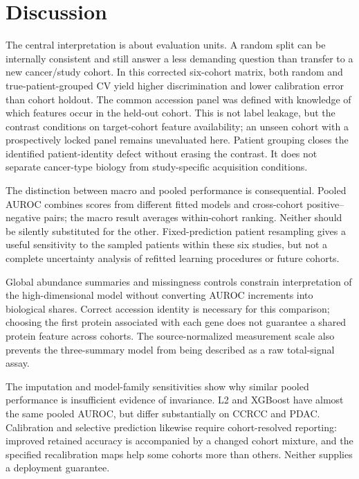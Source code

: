 \section{Discussion}

The central interpretation is about evaluation units. A random split
can be internally consistent and still answer a less demanding question
than transfer to a new cancer/study cohort. In this corrected six-cohort
matrix, both random and true-patient-grouped CV yield higher
discrimination and lower calibration error than cohort holdout.
The common accession panel was defined with knowledge of which features
occur in the held-out cohort. This is not label leakage, but the
contrast conditions on target-cohort feature availability; an unseen
cohort with a prospectively locked panel remains unevaluated here.
Patient grouping closes the identified patient-identity defect without
erasing the contrast. It does not separate cancer-type biology from
study-specific acquisition conditions.

The distinction between macro and pooled performance is consequential.
Pooled AUROC combines scores from different fitted models and
cross-cohort positive--negative pairs; the macro result averages
within-cohort ranking. Neither should be silently substituted for the
other. Fixed-prediction patient resampling gives a useful sensitivity
to the sampled patients within these six studies, but not a complete
uncertainty analysis of refitted learning procedures or future cohorts.

Global abundance summaries and missingness controls constrain
interpretation of the high-dimensional model without converting AUROC
increments into biological shares. Correct accession identity is
necessary for this comparison; choosing the first protein associated
with each gene does not guarantee a shared protein feature across
cohorts. The source-normalized measurement scale also prevents the
three-summary model from being described as a raw total-signal assay.

The imputation and model-family sensitivities show why similar pooled
performance is insufficient evidence of invariance. L2 and XGBoost
have almost the same pooled AUROC, but differ substantially on CCRCC
and PDAC. Calibration and selective prediction likewise require
cohort-resolved reporting: improved retained accuracy is accompanied
by a changed cohort mixture, and the specified recalibration maps help
some cohorts more than others. Neither supplies a deployment guarantee.

